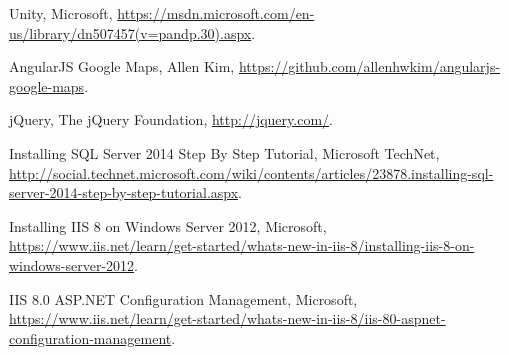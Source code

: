 \documentclass[10pt,a4paper]{article}
\begin{document}
\begin{thebibliography}{99}
	Unity,
	Microsoft,
	\url{https://msdn.microsoft.com/en-us/library/dn507457(v=pandp.30).aspx}.

	AngularJS Google Maps,
	Allen Kim,
	\url{https://github.com/allenhwkim/angularjs-google-maps}.

	jQuery,
 	The jQuery Foundation,
	\url{http://jquery.com/}.

	Installing SQL Server 2014 Step By Step Tutorial,
	Microsoft TechNet,
	\url{http://social.technet.microsoft.com/wiki/contents/articles/23878.installing-sql-server-2014-step-by-step-tutorial.aspx}.

	Installing IIS 8 on Windows Server 2012,
	Microsoft,
	\url{https://www.iis.net/learn/get-started/whats-new-in-iis-8/installing-iis-8-on-windows-server-2012}.

	IIS 8.0 ASP.NET Configuration Management,
	Microsoft,
	\url{https://www.iis.net/learn/get-started/whats-new-in-iis-8/iis-80-aspnet-configuration-management}.

\end{thebibliography}
\end{document}
